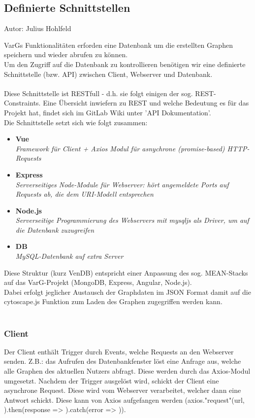 \documentclass[twoside]{report}
\begin{document}
\subsection{Definierte Schnittstellen}
{\small Autor: Julius Hohlfeld}

VarGs Funktionalitäten erforden eine Datenbank um die erstellten Graphen speichern und wieder abrufen zu können.\\
Um den Zugriff auf die Datenbank zu kontrollieren benötigen wir eine definierte Schnittstelle (bzw. API) zwischen Client,
Webserver und Datenbank.\\
\\
Diese Schnittstelle ist RESTfull - d.h. sie folgt einigen der sog. REST-Constraints. Eine Übersicht inwiefern zu REST und welche
Bedeutung es für das Projekt hat, findet sich im GitLab Wiki unter 'API Dokumentation'.\\
Die Schnittstelle setzt sich wie folgt zusammen:
\begin{itemize}
\item \textbf{Vue}
  \\\textit{Framework für Client + Axios Modul für asnychrone (promise-based) HTTP-Requests}
\item  \textbf{Express}
  \\\textit{Serverseitiges Node-Module für Webserver: hört angemeldete Ports auf Requests ab, die dem URI-Modell entsprechen}
\item \textbf{Node.js}
  \\\textit{Serverseitige Programmierung des Webservers mit mysqljs als Driver, um auf die Datenbank zuzugreifen}
\item \textbf{DB}
  \\\textit{MySQL-Datenbank auf extra Server}
\end{itemize}

Diese Struktur (kurz VenDB) entspricht einer Anpassung des sog. MEAN-Stacks auf das VarG-Projekt (MongoDB, Express, Angular, Node.js).\\
Dabei erfolgt jeglicher Austausch der Graphdaten im JSON Format damit auf die cytoscape.js Funktion zum Laden des Graphen zugegriffen werden kann.\\
\\
\subsubsection{Client}

Der Client enthält Trigger durch Events, welche Requests an den Webserver senden. Z.B.: das Aufrufen des Datenbankfenster löst eine Anfrage aus, welche alle Graphen des aktuellen Nutzers abfragt.
Diese werden durch das Axios-Modul umgesetzt. Nachdem der Trigger ausgelöst wird, schickt der Client eine asynchrone Request. Diese wird vom Webserver verarbeitet, welcher dann eine Antwort schickt. Diese kann von Axios aufgefangen werden (axios."request"(url, {}).then(response => {}).catch(error => {})). 
\end{document}
